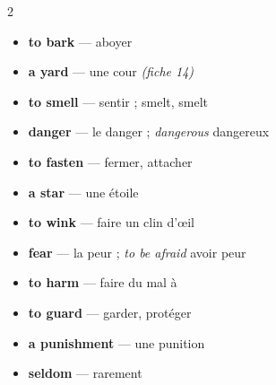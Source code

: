 \documentclass[troisieme]{fiche}
\begin{document}
\begin{multicols}{2}\small
\begin{itemize}[label=--,itemsep=0.8mm,leftmargin=*]
  \item \textbf{to bark} — aboyer
  \item \textbf{a yard} — une cour \textit{(fiche 14)}
  \item \textbf{to smell} — sentir ; smelt, smelt
  \item \textbf{danger} — le danger ; \textit{dangerous} dangereux
  \item \textbf{to fasten} — fermer, attacher
  \item \textbf{a star} — une étoile
  \item \textbf{to wink} — faire un clin d'œil
  \item \textbf{fear} — la peur ; \textit{to be afraid} avoir peur
  \item \textbf{to harm} — faire du mal à
  \item \textbf{to guard} — garder, protéger
  \item \textbf{a punishment} — une punition
  \item \textbf{seldom} — rarement
\end{itemize}
\end{multicols}
\end{document}
